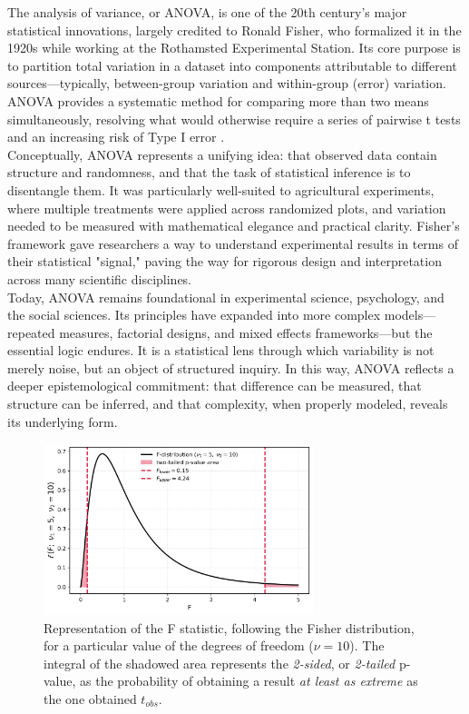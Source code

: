\documentclass{book}
\begin{document}
The analysis of variance, or ANOVA, is one of the 20th century's major statistical innovations, largely credited to Ronald Fisher, who formalized it in the 1920s while working at the Rothamsted Experimental Station. Its core purpose is to partition total variation in a dataset into components attributable to different sources—typically, between-group variation and within-group (error) variation. ANOVA provides a systematic method for comparing more than two means simultaneously, resolving what would otherwise require a series of pairwise t tests and an increasing risk of Type I error 
\cite{fisher1925}.\\

Conceptually, ANOVA represents a unifying idea: that observed data contain structure and randomness, and that the task of statistical inference is to disentangle them. It was particularly well-suited to agricultural experiments, where multiple treatments were applied across randomized plots, and variation needed to be measured with mathematical elegance and practical clarity. Fisher’s framework gave researchers a way to understand experimental results in terms of their statistical "signal," paving the way for rigorous design and interpretation across many scientific disciplines.\\

Today, ANOVA remains foundational in experimental science, psychology, and the social sciences. Its principles have expanded into more complex models—repeated measures, factorial designs, and mixed effects frameworks—but the essential logic endures. It is a statistical lens through which variability is not merely noise, but an object of structured inquiry. In this way, ANOVA reflects a deeper epistemological commitment: that difference can be measured, that structure can be inferred, and that complexity, when properly modeled, reveals its underlying form.\\

\begin{figure}[ht]
    \centering
    \includegraphics[width=0.7\textwidth]{figures/chapter4/f_test_two_tailed.png}
    \caption{Representation of the F statistic, following the Fisher distribution, for a particular value of the degrees of freedom ($\nu = 10$). The integral of the shadowed area represents the \textit{2-sided}, or \textit{2-tailed} p-value, as the probability of obtaining a result \textit{at least as extreme} as the one obtained $t_{obs}$.}
    \label{fig:f_test2}
\end{figure}
\end{document}
